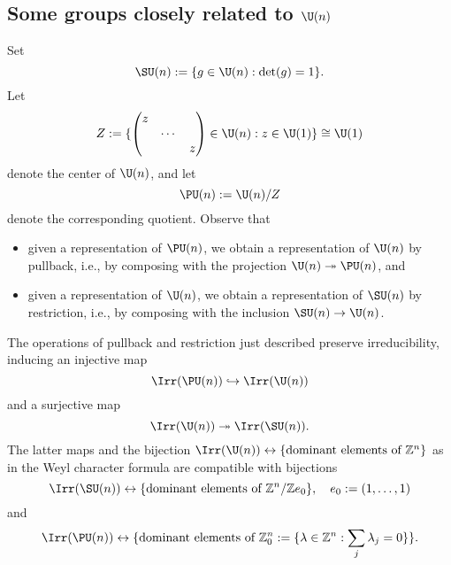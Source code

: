 \documentclass[reqno]{amsart} 
\begin{document}
\subsection{Some groups closely related to \texorpdfstring{$\U(n)$}{U(n)}}\label{sec:some-groups-closely}
Set
\begin{equation*}
  \SU(n) := \{g \in \U(n) : \det(g) = 1 \}.
\end{equation*}
Let
\begin{equation}
  Z := \{
\begin{pmatrix}
    z &  &  \\
      & \dotsb  &  \\
      &  & z 
  \end{pmatrix}
 \in \U(n) : z \in \U(1)\} \cong \U(1)
\end{equation}
denote the center of $\U(n)$, and let
\begin{equation*}
  \PU(n) := \U(n)/Z
\end{equation*}
denote the corresponding quotient.  Observe that
\begin{itemize}
\item given a representation of $\PU(n)$, we obtain a representation of $\U(n)$ by pullback, i.e., by composing with the projection $\U(n) \twoheadrightarrow \PU(n)$, and
\item given a representation of $\U(n)$, we obtain a representation of $\SU(n)$ by restriction, i.e., by composing with the inclusion $\SU(n) \rightarrow \U(n)$.
\end{itemize}
\begin{theorem}\label{thm:SU-PU}
  The operations of pullback and restriction just described preserve irreducibility, inducing an injective map
  \begin{equation*}
    \Irr(\PU(n)) \hookrightarrow \Irr(\U(n))
  \end{equation*}
  and a surjective map
  \begin{equation*}
    \Irr(\U(n)) \twoheadrightarrow \Irr(\SU(n)).
  \end{equation*}
  The latter maps and the bijection $\Irr(\U(n)) \leftrightarrow \{\text{dominant elements of }\mathbb{Z}^n\}$ as in the Weyl character formula are compatible with bijections
  \begin{equation*}
\Irr(\SU(n))
    \leftrightarrow \{\text{dominant elements of }\mathbb{Z}^n / \mathbb{Z} e_0 \}, \quad e_0 := (1,\dotsc,1)
\end{equation*}
 and 
\begin{equation*}
\Irr(\PU(n)) \leftrightarrow \{\text{dominant elements of }\mathbb{Z}^n_0 := \{\lambda \in \mathbb{Z}^n : \sum_j \lambda_j = 0\} \}.
\end{equation*}
\end{theorem}
\end{document}
